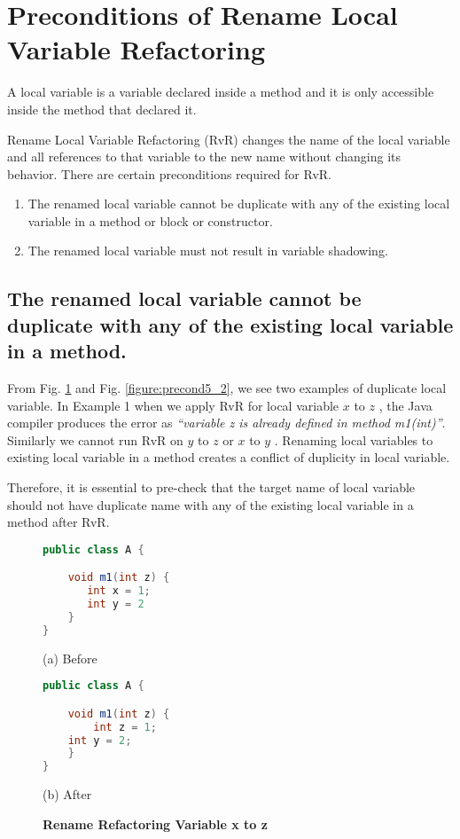 \section{\textbf{Preconditions of Rename Local Variable Refactoring}}
A local variable is a variable declared inside a method and it is only accessible inside the method that declared it.

Rename Local Variable Refactoring (RvR) changes the name of the local variable and all references to that variable to the new name without changing its behavior. There are certain preconditions required for RvR.
\begin{enumerate}
\item The renamed local variable cannot be duplicate with any of the existing local variable in a method or block or constructor.
\item The renamed local variable must not result in variable shadowing.
\end{enumerate}

\subsection{The renamed local variable cannot be duplicate with any of the existing local variable in a method.}
 
From Fig. \ref{figure:precond5_1} and Fig. \ref{figure:precond5_2}, we see two examples of duplicate local variable. In Example 1 when we apply RvR for local variable $x$ to $z$ , the Java compiler produces the error as \textit{``variable z is already defined in method m1(int)''}. Similarly we cannot run RvR on $y$ to $z$ or $x$  to $y$ . Renaming local variables to existing local variable in a method creates a conflict of duplicity in local variable.

Therefore, it is essential to pre-check that the target name of local variable should not have duplicate name with any of the existing local variable in a method after RvR.

\begin{figure}[th]
\centering
\begin{minipage}[t]{0.4\linewidth}
\begin{lstlisting}[language=java, basicstyle=\scriptsize\ttfamily,frame=single]
public class A {

    void m1(int z) {
       int x = 1; 
       int y = 2
    }
}
\end{lstlisting}
\centering(a) Before
\end{minipage}
\hfill
\begin{minipage}[t]{0.4\linewidth}
\begin{lstlisting}[language=java, basicstyle=\scriptsize\ttfamily,frame=single]
public class A {

    void m1(int z) {
        int z = 1; 
	int y = 2;
    }
}
\end{lstlisting}
\centering(b) After 
\end{minipage}
\caption{\textbf{Rename Refactoring Variable x to z}}
\label{figure:precond5_1}
\end{figure}

